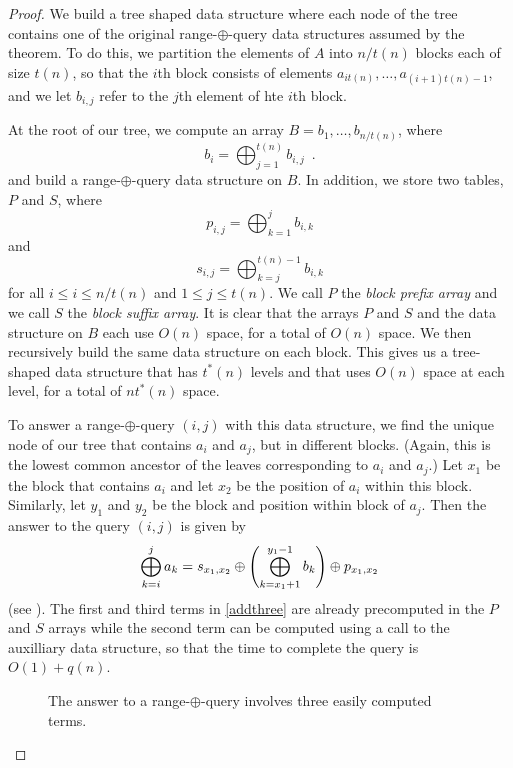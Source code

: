 \documentclass[lotsofwhite]{patmorin}
\begin{document}
\begin{proof}
We build a tree shaped data structure where each node of the tree
contains one of the original range-$\oplus$-query data structures
assumed by the theorem.  To do this, we partition the elements of $A$
into $n/t(n)$ blocks each of size $t(n)$, so that the $i$th block
consists of elements $a_{it(n)},\ldots,a_{(i+1)t(n)-1}$, and we let
$b_{i,j}$ refer to the $j$th element of hte $i$th block.

At the root of our tree, we compute an array
$B=b_1,\ldots,b_{n/t(n)}$, where
\[
b_i = \bigoplus_{j=1}^{t(n)} b_{i,j} \enspace .
\]
and build a range-$\oplus$-query data structure on $B$.  In addition,
we store two tables, $P$ and $S$, where
\[
p_{i,j} = \bigoplus_{k=1}^{j} b_{i,k}
\]
and 
\[
s_{i,j} = \bigoplus_{k=j}^{t(n)-1} b_{i,k}
\]
for all $i\le i\le n/t(n)$ and $1\le j\le t(n)$.  We call $P$ the
\emph{block prefix array} and we call $S$ the \emph{block suffix
array}.  It is clear that the arrays $P$ and $S$ and the data
structure on $B$ each use $O(n)$ space, for a total of $O(n)$ space.
We then recursively build the same data structure on each block. This
gives us a tree-shaped data structure that has $t^*(n)$ levels and
that uses $O(n)$ space at each level, for a total of $nt^*(n)$ space.

To answer a range-$\oplus$-query $(i,j)$ with this data structure, we
find the unique node of our tree that contains $a_i$ and $a_j$, but in
different blocks. (Again, this is the lowest common ancestor of the
leaves corresponding to $a_i$ and $a_j$.)  Let $x_1$ be the block that
contains $a_i$ and let $x_2$ be the position of $a_i$ within this
block.  Similarly, let $y_1$ and $y_2$ be the block and position
within block of $a_j$. Then the answer to the query $(i,j)$ is given
by
\begin{equation}
   \bigoplus_{k=i}^j a_k = s_{x_1,x_2}\oplus \left(\bigoplus_{k=x_1+1}^{y_1-1} b_k\right) \oplus p_{x_1,x_2} \eqlabel{addthree}
\end{equation}
(see ).  The first and third terms in \eqref{addthree}
are already precomputed in the $P$ and $S$ arrays while the second
term can be computed using a call to the auxilliary data structure, so
that the time to complete the query is $O(1)+q(n)$.
\begin{figure}
\caption{The answer to a range-$\oplus$-query involves three easily
computed terms.}
\end{figure}
\end{proof}
\end{document}
